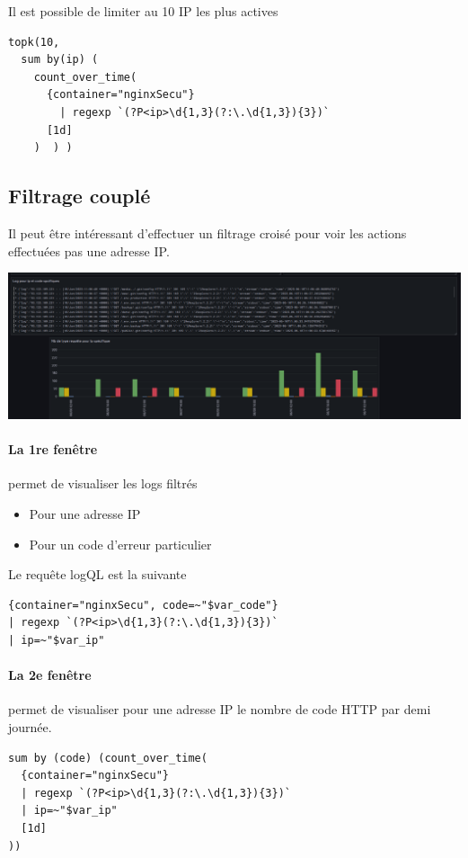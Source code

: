 \documentclass[french, 12pt]{article}%
\newcommand{\itemE}{\item[$\bullet$]}
\begin{document}
\vspace{0.5cm}
Il est possible de limiter au 10 IP les plus actives

\begin{lstlisting}[style=commande]
topk(10,
  sum by(ip) (
    count_over_time(
      {container="nginxSecu"} 
        | regexp `(?P<ip>\d{1,3}(?:\.\d{1,3}){3})`
      [1d]
    )  ) )
\end{lstlisting}
\subsection{Filtrage couplé}

Il peut être intéressant d'effectuer un filtrage croisé pour voir les actions effectuées pas une adresse IP. 


\begin{center}
\includegraphics[scale=0.3]{./ressource/filtrageCroise}
\end{center}

\paragraph{La 1re fenêtre} permet de visualiser les logs filtrés
\begin{itemize}
\itemE Pour une adresse IP
\itemE Pour un code d'erreur particulier
\end{itemize}

Le requête logQL est la suivante 
\begin{lstlisting}[style=commande]
{container="nginxSecu", code=~"$var_code"}
| regexp `(?P<ip>\d{1,3}(?:\.\d{1,3}){3})`
| ip=~"$var_ip"
\end{lstlisting}


\paragraph{La 2e fenêtre} permet de visualiser pour une adresse IP le nombre de code HTTP par demi journée.

\begin{lstlisting}[style=commande]
sum by (code) (count_over_time(
  {container="nginxSecu"}
  | regexp `(?P<ip>\d{1,3}(?:\.\d{1,3}){3})`
  | ip=~"$var_ip"
  [1d]
))
\end{lstlisting}
\end{document}
